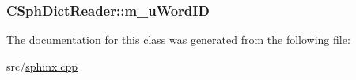 \hypertarget{classCSphDictReader_a7d418315d3e96c281ab9ba0caf9ab873}{
\subsubsection[{m\-\_\-u\-Word\-I\-D}]{ C\-Sph\-Dict\-Reader\-::m\-\_\-u\-Word\-I\-D}}\label{classCSphDictReader_a7d418315d3e96c281ab9ba0caf9ab873}


The documentation for this class was generated from the following file\-:\begin{DoxyCompactItemize}
\item 
src/\hyperlink{sphinx_8cpp}{sphinx.\-cpp}\end{DoxyCompactItemize}
